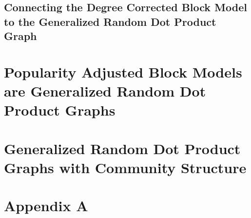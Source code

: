 \documentclass[
  11pt,
]{article}
\begin{document}
\hypertarget{connecting-the-degree-corrected-block-model-to-the-generalized-random-dot-product-graph}{%
\subsection{Connecting the Degree Corrected Block Model to the
Generalized Random Dot Product
Graph}\label{connecting-the-degree-corrected-block-model-to-the-generalized-random-dot-product-graph}}

\newpage

\hypertarget{popularity-adjusted-block-models-are-generalized-random-dot-product-graphs}{%
\section{Popularity Adjusted Block Models are Generalized Random Dot
Product
Graphs}\label{popularity-adjusted-block-models-are-generalized-random-dot-product-graphs}}

\newpage

\hypertarget{generalized-random-dot-product-graphs-with-community-structure}{%
\section{Generalized Random Dot Product Graphs with Community
Structure}\label{generalized-random-dot-product-graphs-with-community-structure}}

\newpage

\section*{Appendix A}

\newpage

\renewcommand\refname{References}
  
\end{document}
